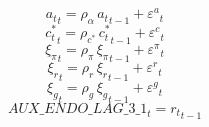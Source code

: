 \begin{dmath}
{a_t}_{t}={\rho_{\alpha}}\, {a_t}_{t-1}+{{\varepsilon^a}}_{t}
\end{dmath}
\begin{dmath}
{c_t^*}_{t}={\rho_{c^*}}\, {c_t^*}_{t-1}+{{\varepsilon^c}}_{t}
\end{dmath}
\begin{dmath}
{\xi_{\pi}}_{t}={\rho_{\pi}}\, {\xi_{\pi}}_{t-1}+{{\varepsilon^{\pi}}}_{t}
\end{dmath}
\begin{dmath}
{\xi_{r}}_{t}={\rho_{r}}\, {\xi_{r}}_{t-1}+{{\varepsilon^{r}}}_{t}
\end{dmath}
\begin{dmath}
{\xi_{g}}_{t}={\rho_{g}}\, {\xi_{g}}_{t-1}+{{\varepsilon^{g}}}_{t}
\end{dmath}
\begin{dmath}
{AUX\_ENDO\_LAG\_3\_1}_{t}={r_t}_{t-1}
\end{dmath}
